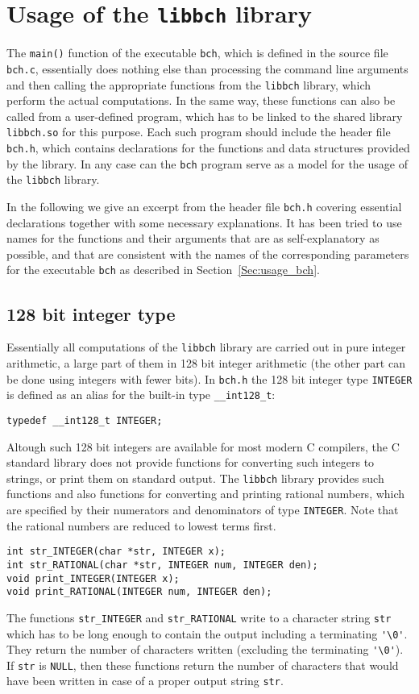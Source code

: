 \documentclass[11pt,a4paper]{article}
\begin{document}
\section{Usage of the {\tt libbch} library}
The \verb|main()| function 
of  the executable \verb|bch|, which is
defined in the source file \verb|bch.c|, essentially does nothing else
than processing the command line arguments and then calling 
the appropriate functions from the \verb|libbch| library, which
perform the actual computations.
In the same way, these functions can also be called from a user-defined program,
which has to be linked to the 
shared library \verb|libbch.so| for this purpose.
Each such program should include the header file
\verb|bch.h|, which contains declarations 
for the functions and data structures provided by the library.
In any case can the \verb|bch| program serve as a model for
the usage of the  \verb|libbch| library.

In the following we give an 
excerpt from the header file \verb|bch.h|
covering  essential declarations together with some
necessary explanations. 
It has been tried to use names for the functions and their arguments
that are as self-explanatory as possible, and that are consistent with
the names of the corresponding parameters for the executable \verb|bch|
as described in Section~\ref{Sec:usage_bch}.

\subsection{128 bit integer type}
Essentially all computations of the \verb|libbch| library are carried out in pure integer arithmetic, a
large part of them in 128 bit integer arithmetic (the other part can be done
using integers with fewer bits). In \verb|bch.h| 
the 128 bit integer type  \verb|INTEGER| is defined
as an alias for the built-in type \verb|__int128_t|:
\begin{verbatim}
typedef __int128_t INTEGER; 
\end{verbatim}
Altough such 128 bit integers are available for most modern
C compilers, the C %
standard library does not
provide functions for converting such integers to strings, or print them 
on standard output. The \verb|libbch| library provides such functions and also functions 
for converting and printing rational numbers, which are 
specified by their numerators and denominators of type \verb|INTEGER|.
Note that the rational numbers are reduced to lowest terms first.
\begin{verbatim}
int str_INTEGER(char *str, INTEGER x);
int str_RATIONAL(char *str, INTEGER num, INTEGER den);
void print_INTEGER(INTEGER x);
void print_RATIONAL(INTEGER num, INTEGER den);
\end{verbatim}
The functions \verb|str_INTEGER| and \verb|str_RATIONAL| write
to a character string \verb|str| which has to be long enough 
to contain the output including a terminating \verb|'\0'|.
They return the number of characters written (excluding the terminating \verb|'\0'|).
If \verb|str| is \verb|NULL|, then these functions return the number
of characters that would have been written in case of a proper output
string \verb|str|.
\end{document}
